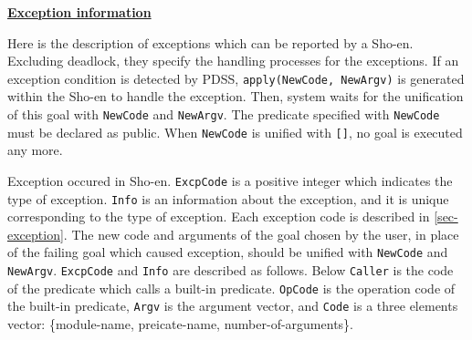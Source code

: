 \noindent\underline{\bf Exception information}
\vspace{1ex}\par
Here is the description of exceptions which can be
reported by a Sho-en.
Excluding deadlock, they specify the handling processes for the exceptions.
If an exception condition is detected by PDSS, 
\verb|apply(NewCode, NewArgv)| is generated within the Sho-en 
to handle the exception.
Then, system waits for the unification of this goal with \verb|NewCode| and
\verb|NewArgv|.
The predicate specified with \verb|NewCode| must be declared as public.
When \verb|NewCode| is unified with \verb|[]|, no goal is executed any more.
\begin{itemize}

Exception occured in Sho-en. \verb|ExcpCode| is a positive integer 
which indicates the type of exception.
\verb|Info| is an information about the exception, and
it is unique corresponding to the type of exception.
Each exception code is described in \ref{sec-exception}.
The new code and arguments of the goal chosen
by the user, in place of the failing goal which caused exception, should be
unified with \verb|NewCode| and \verb|NewArgv|.
\verb|ExcpCode| and \verb|Info| are described as follows.
Below \verb|Caller| is the code of the predicate 
which calls a built-in predicate.
\verb|OpCode| is the operation code of the built-in predicate, 
\verb|Argv| is the argument vector, and \verb|Code| is a three elements vector:
\{module-name, preicate-name, number-of-arguments\}.


\end{itemize}
